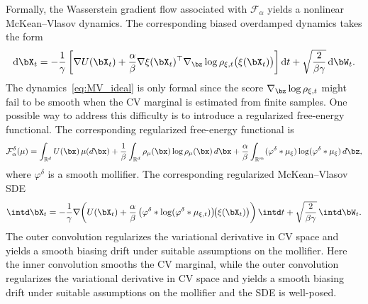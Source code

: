 \documentclass[a4paper,fleqn]{cas-sc}
\theoremstyle{definition}
\begin{document}
Formally, the Wasserstein gradient flow associated with \(\mathcal F_\alpha\) yields a nonlinear McKean--Vlasov dynamics. 
The corresponding biased overdamped dynamics takes the form
\begin{equation}
{\rm d}\bX_t
=
-\frac{1}{\gamma}
\left[
\nabla U(\bX_t)
+
\frac{\alpha}{\beta}
\nabla\xi(\bX_t)^{\top}
\nabla_{\bz}\log\rho_{\xi,t}\bigl(\xi(\bX_t)\bigr)
\right]{\rm d}t
+
\sqrt{\frac{2}{\beta\gamma}}\, {\rm d}\bW_t .
\label{eq:MV_ideal}
\end{equation}
The dynamics~\eqref{eq:MV_ideal} is only formal since the score \(\nabla_{\bz}\log\rho_{\xi,t}\) might fail to be smooth when the CV marginal is estimated from finite samples. 
One possible way to address this difficulty is to introduce a regularized free-energy functional.  
The corresponding regularized free-energy functional is
\begin{equation}\label{eq:Falpha_delta}
    \mathcal F_\alpha^\delta(\mu)
    =
    \int_{\mathbb R^d} U(\bx)\,\mu(d\bx)
    +
    \frac{1}{\beta}
    \int_{\mathbb R^d}
    \rho_\mu(\bx)\log\rho_\mu(\bx)\,d\bx
    +
    \frac{\alpha}{\beta}
    \int_{\mathbb R^m}
   (\varphi^\delta*\mu_\xi) \log (\varphi^\delta*\mu_\xi) \,d\bz, 
\end{equation}
where \(\varphi^\delta\) is a smooth mollifier. The corresponding regularized McKean--Vlasov SDE
\begin{equation}\label{eq:MV_delta}
    \intd \bX_t = -\frac{1}{\gamma}\nabla\!\left(U(\bX_t) + \frac{\alpha}{\beta}\,\bigl(\varphi^\delta * \log(\varphi^\delta * \mu_{\xi,t})\bigr)\!\bigl(\xi(\bX_t)\bigr) \right)\intd t + \sqrt{\frac{2}{\beta\gamma}}\,\intd \bW_t.
\end{equation}
The outer convolution regularizes the variational derivative in CV space and yields a smooth biasing drift under suitable assumptions on the mollifier. Here the inner convolution smooths the CV marginal, while the outer convolution regularizes the variational derivative in CV space and yields a smooth biasing drift under suitable assumptions on the mollifier and the SDE is well-posed. 
\end{document}
